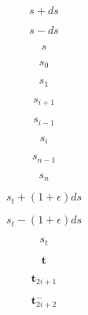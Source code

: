 \documentclass[a4paper,10pt,fleqn]{book}
\newcommand{\vect}[1]{\boldsymbol{#1}}
\begin{document}
\begin{equation}
s + ds
\end{equation}


\begin{equation}
s-ds
\end{equation}


\begin{equation}
s
\end{equation}


\begin{equation}
s_{0}
\end{equation}


\begin{equation}
s_{1}
\end{equation}


\begin{equation}
s_{i+1}
\end{equation}


\begin{equation}
s_{i-1}
\end{equation}


\begin{equation}
s_{i}
\end{equation}


\begin{equation}
s_{n-1}
\end{equation}


\begin{equation}
s_{n}
\end{equation}


\begin{equation}
s_t + (1+\epsilon)ds
\end{equation}


\begin{equation}
s_t - (1+\epsilon)ds
\end{equation}


\begin{equation}
s_t
\end{equation}


\begin{equation}
\vect{t}
\end{equation}


\begin{equation}
\vect{t}_{2i+1}
\end{equation}


\begin{equation}
\vect{t}_{2i+2}^-
\end{equation}
\end{document}
